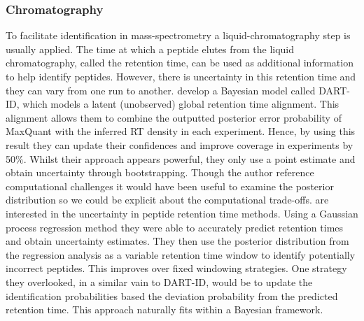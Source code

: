 \documentclass[12pt,english]{article}
\begin{document}
\subsubsection{Chromatography}
To facilitate identification in mass-spectrometry a liquid-chromatography step is usually applied. The time at which a peptide elutes from the liquid chromatography, called the retention time, can be used as additional information to help identify peptides. However, there is uncertainty in this retention time and they can vary from one run to another. \citet{Chen::2019} develop a Bayesian model called DART-ID, which models a latent (unobserved) global retention time alignment. This alignment allows them to combine the outputted posterior error probability of MaxQuant with the inferred RT density in each experiment. Hence, by using this result they can update their confidences and improve coverage in experiments by 50$\%$. Whilst their approach appears powerful, they only use a point estimate and obtain uncertainty through bootstrapping. Though the author reference computational challenges it would have been useful to examine the posterior distribution so we could be explicit about the computational trade-offs. \citet{Maboudi::2017} are interested in the uncertainty in peptide retention time methods. Using a Gaussian process regression method they were able to accurately predict retention times and obtain uncertainty estimates. They then use the posterior distribution from the regression analysis as a variable retention time window to identify potentially incorrect peptides. This improves over fixed windowing strategies. One strategy they overlooked, in a similar vain to DART-ID, would be to update the identification probabilities based the deviation probability from the predicted retention time. This approach naturally fits within a Bayesian framework. 
\end{document}
